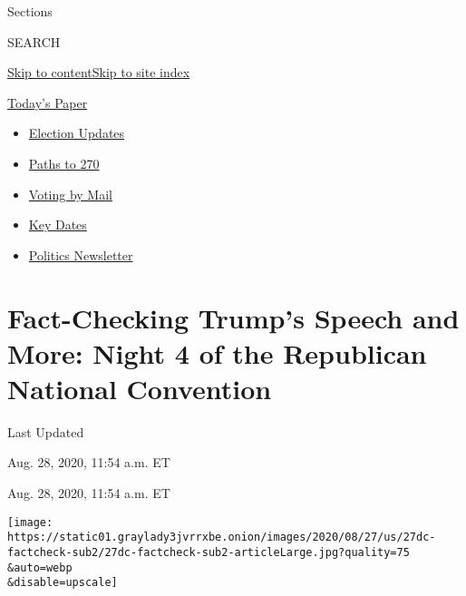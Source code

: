 Sections

SEARCH

\protect\hyperlink{site-content}{Skip to
content}\protect\hyperlink{site-index}{Skip to site index}

\href{https://myaccount.nytimes3xbfgragh.onion/auth/login?response_type=cookie\&client_id=vi}{}

\href{https://www.nytimes3xbfgragh.onion/section/todayspaper}{Today's
Paper}

\begin{itemize}
\item
  \href{https://www.nytimes3xbfgragh.onion/live/2020/09/08/us/trump-vs-biden?action=click\&pgtype=Article\&state=default\&region=TOP_BANNER\&context=storylines_menu}{Election
  Updates}
\item
  \href{https://www.nytimes3xbfgragh.onion/interactive/2020/us/elections/election-states-biden-trump.html?action=click\&pgtype=Article\&state=default\&region=TOP_BANNER\&context=storylines_menu}{Paths
  to 270}
\item
  \href{https://www.nytimes3xbfgragh.onion/interactive/2020/08/31/us/politics/vote-by-mail-deadlines.html?action=click\&pgtype=Article\&state=default\&region=TOP_BANNER\&context=storylines_menu}{Voting
  by Mail}
\item
  \href{https://www.nytimes3xbfgragh.onion/interactive/2019/us/elections/2020-presidential-election-calendar.html?action=click\&pgtype=Article\&state=default\&region=TOP_BANNER\&context=storylines_menu}{Key
  Dates}
\item
  \href{https://www.nytimes3xbfgragh.onion/newsletters/politics?action=click\&pgtype=Article\&state=default\&region=TOP_BANNER\&context=storylines_menu}{Politics
  Newsletter}
\end{itemize}

\hypertarget{fact-checking-trumps-speech-and-more-night-4-of-the-republican-national-convention}{%
\section{Fact-Checking Trump's Speech and More: Night 4 of the
Republican National
Convention}\label{fact-checking-trumps-speech-and-more-night-4-of-the-republican-national-convention}}

Last Updated

Aug. 28, 2020, 11:54 a.m. ET

Aug. 28, 2020, 11:54 a.m. ET

\texttt{[image: https://static01.graylady3jvrrxbe.onion/images/2020/08/27/us/27dc-factcheck-sub2/27dc-factcheck-sub2-articleLarge.jpg?quality=75\\\&auto=webp\\\&disable=upscale]}

